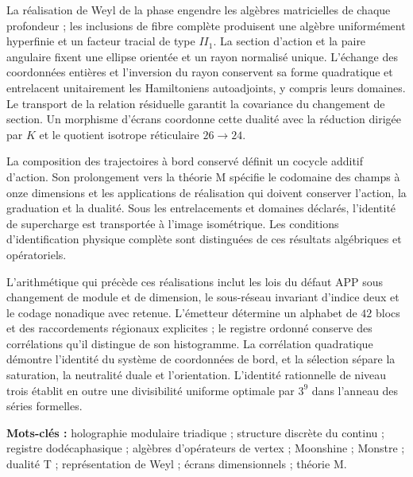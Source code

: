 La réalisation de Weyl de la phase engendre les algèbres matricielles de chaque
profondeur ; les inclusions de fibre complète produisent une algèbre
uniformément hyperfinie et un facteur tracial de type \(II_1\).
La section d’action et la paire angulaire fixent une ellipse orientée et un
rayon normalisé unique. L’échange des coordonnées entières et
l’inversion du rayon conservent sa forme quadratique et entrelacent
unitairement les Hamiltoniens autoadjoints, y compris leurs domaines.
Le transport de la relation résiduelle garantit la covariance du changement
de section. Un morphisme d’écrans coordonne cette dualité avec la réduction
dirigée par \(K\) et le quotient isotrope réticulaire \(26\to24\).

La composition des trajectoires à bord conservé définit un cocycle
additif d’action. Son prolongement vers la théorie M spécifie le
codomaine des champs à onze dimensions et les applications de réalisation qui
doivent conserver l’action, la graduation et la dualité. Sous les entrelacements
et domaines déclarés, l’identité de supercharge est transportée à l’image
isométrique. Les conditions d’identification physique complète sont
distinguées de ces résultats algébriques et opératoriels.
\par\medskip

L’arithmétique qui précède ces réalisations inclut les lois du
défaut APP sous changement de module et de dimension, le sous-réseau invariant
d’indice deux et le codage nonadique avec retenue. L’émetteur détermine
un alphabet de \(42\) blocs et des raccordements régionaux explicites ; le registre
ordonné conserve des corrélations qu’il distingue de son histogramme. La
corrélation quadratique démontre l’identité du système de coordonnées de bord,
et la sélection sépare la saturation, la neutralité duale et l’orientation. L’identité
rationnelle de niveau trois établit en outre une divisibilité
uniforme optimale par \(3^9\) dans l’anneau des séries formelles.

\noindent\textbf{Mots-clés :} holographie modulaire triadique ; structure
discrète du continu ; registre dodécaphasique ; algèbres d’opérateurs de
vertex ; Moonshine ; Monstre ; dualité T ; représentation de Weyl ;
écrans dimensionnels ; théorie M.
\par\endgroup

